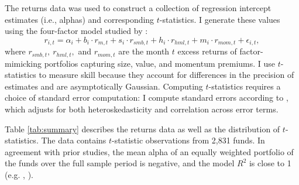 	The returns data was used to construct a collection of regression intercept estimates (i.e., alphas) and corresponding $t$-statistics. I generate these values using the four-factor model studied by \citet{Carhart1997}:
	\begin{equation}
		\label{eqn:carhart}
		r_{i, t} = \alpha_{i} + b_{i} \cdot r_{m, t} + s_{i} \cdot r_{smb, t} + h_{i} \cdot r_{hml, t} + m_{i} \cdot r_{mom, t} + \epsilon_{i, t},
	\end{equation}
	where $r_{smb, t}, \ r_{hml, t},$ and $r_{mom, t}$ are the month $t$ excess returns of factor-mimicking portfolios capturing size, value, and momentum premiums.  I use $t$-statistics to measure skill because they account for differences in the precision of estimates and are asymptotically Gaussian.  Computing $t$-statistics requires a choice of standard error computation: I compute standard errors according to \citet{Newey1994}, which adjusts for both heteroskedasticity and correlation across error terms.

	Table \ref{tab:summary} describes the returns data as well as the distribution of $t$-statistics.  The data contains $t$-statistic observations from 2,831 funds.  In agreement with prior studies, the mean alpha of an equally weighted portfolio of the funds over the full sample period is negative, and the model $R^2$ is close to 1 (e.g. \citet{Barras2010}, \citet{Carhart1997}).

